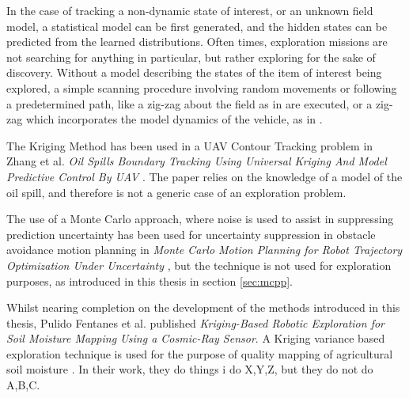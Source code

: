 In the case of tracking a non-dynamic state of interest, or an unknown field model, a statistical model can be first generated, and the hidden states can be predicted from the learned distributions. Often times, exploration missions are not searching for anything in particular, but rather exploring for the sake of discovery. Without a model describing the states of the item of interest being explored, a simple scanning procedure involving random movements or following a predetermined path, like a zig-zag about the field as in \cite{semsch:uav_zig} are executed, or a zig-zag which incorporates the model dynamics of the vehicle, as in \cite{nigam:zigzag}.

The Kriging Method has been used in a UAV Contour Tracking problem in Zhang et al. \textit{Oil Spills Boundary Tracking Using Universal Kriging And Model Predictive Control By UAV} \cite{zhang:oil_krig}. The paper relies on the knowledge of a model of the oil spill, and therefore is not a generic case of an exploration problem.

The use of a Monte Carlo approach, where noise is used to assist in suppressing prediction uncertainty has been used for uncertainty suppression in obstacle avoidance motion planning in \textit{Monte Carlo Motion Planning for Robot Trajectory Optimization Under Uncertainty} \cite{janson:mcmp}, but the technique is not used for exploration purposes, as introduced in this thesis in section \ref{sec:mcpp}.


Whilst nearing completion on the development of the methods introduced in this thesis, Pulido Fentanes et al. published \textit{Kriging-Based Robotic Exploration for Soil Moisture Mapping Using a Cosmic-Ray Sensor}. A Kriging variance based exploration technique is used for the purpose of quality mapping of agricultural soil moisture \cite{fentanes:soilkrig}. In their work, they do things i do X,Y,Z, but they do not do A,B,C.

